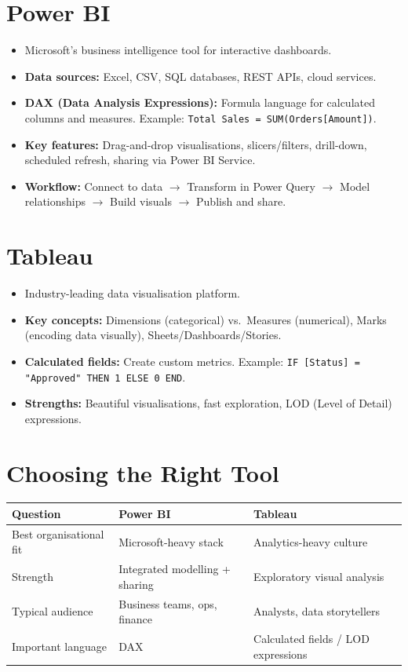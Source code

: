 \documentclass[12pt, a4paper, oneside]{book}
\begin{document}
\section{Power BI}
\begin{itemize}[leftmargin=2em]
    \item Microsoft's business intelligence tool for interactive dashboards.
    \item \textbf{Data sources:} Excel, CSV, SQL databases, REST APIs, cloud services.
    \item \textbf{DAX (Data Analysis Expressions):} Formula language for calculated columns and measures. Example: \texttt{Total Sales = SUM(Orders[Amount])}.
    \item \textbf{Key features:} Drag-and-drop visualisations, slicers/filters, drill-down, scheduled refresh, sharing via Power BI Service.
    \item \textbf{Workflow:} Connect to data $\to$ Transform in Power Query $\to$ Model relationships $\to$ Build visuals $\to$ Publish and share.
\end{itemize}

\section{Tableau}
\begin{itemize}[leftmargin=2em]
    \item Industry-leading data visualisation platform.
    \item \textbf{Key concepts:} Dimensions (categorical) vs.\ Measures (numerical), Marks (encoding data visually), Sheets/Dashboards/Stories.
    \item \textbf{Calculated fields:} Create custom metrics. Example: \texttt{IF [Status] = "Approved" THEN 1 ELSE 0 END}.
    \item \textbf{Strengths:} Beautiful visualisations, fast exploration, LOD (Level of Detail) expressions.
\end{itemize}

\section{Choosing the Right Tool}

\begin{center}
\begin{tabular}{l l l}
\toprule
\textbf{Question} & \textbf{Power BI} & \textbf{Tableau} \\
\midrule
Best organisational fit & Microsoft-heavy stack & Analytics-heavy culture \\
Strength & Integrated modelling + sharing & Exploratory visual analysis \\
Typical audience & Business teams, ops, finance & Analysts, data storytellers \\
Important language & DAX & Calculated fields / LOD expressions \\
\bottomrule
\end{tabular}
\end{center}
\end{document}
